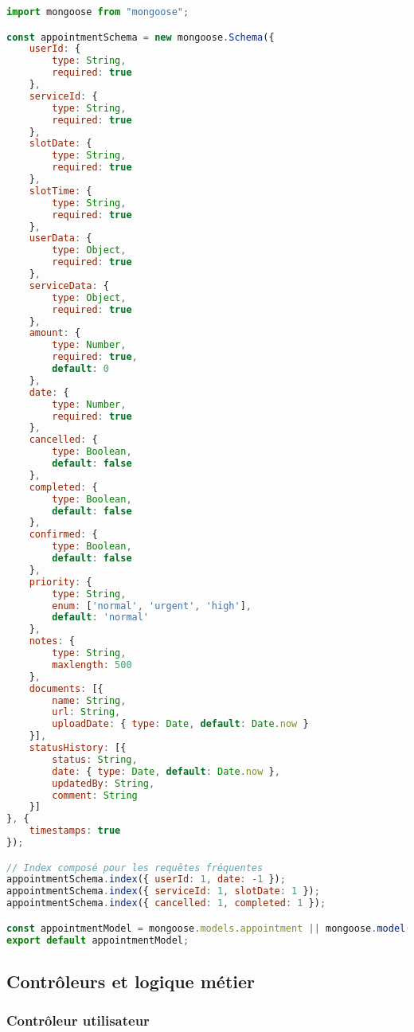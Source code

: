 \begin{lstlisting}[language=JavaScript, caption=appointmentModel.js]
import mongoose from "mongoose";

const appointmentSchema = new mongoose.Schema({
    userId: { 
        type: String, 
        required: true 
    },
    serviceId: { 
        type: String, 
        required: true 
    },
    slotDate: { 
        type: String, 
        required: true 
    },
    slotTime: { 
        type: String, 
        required: true 
    },
    userData: { 
        type: Object, 
        required: true 
    },
    serviceData: { 
        type: Object, 
        required: true 
    },
    amount: { 
        type: Number, 
        required: true,
        default: 0
    },
    date: { 
        type: Number, 
        required: true 
    },
    cancelled: { 
        type: Boolean, 
        default: false 
    },
    completed: { 
        type: Boolean, 
        default: false 
    },
    confirmed: {
        type: Boolean,
        default: false
    },
    priority: {
        type: String,
        enum: ['normal', 'urgent', 'high'],
        default: 'normal'
    },
    notes: {
        type: String,
        maxlength: 500
    },
    documents: [{
        name: String,
        url: String,
        uploadDate: { type: Date, default: Date.now }
    }],
    statusHistory: [{
        status: String,
        date: { type: Date, default: Date.now },
        updatedBy: String,
        comment: String
    }]
}, { 
    timestamps: true 
});

// Index composé pour les requêtes fréquentes
appointmentSchema.index({ userId: 1, date: -1 });
appointmentSchema.index({ serviceId: 1, slotDate: 1 });
appointmentSchema.index({ cancelled: 1, completed: 1 });

const appointmentModel = mongoose.models.appointment || mongoose.model('appointment', appointmentSchema);
export default appointmentModel;
\end{lstlisting}

\subsection{Contrôleurs et logique métier}

\subsubsection{Contrôleur utilisateur}

